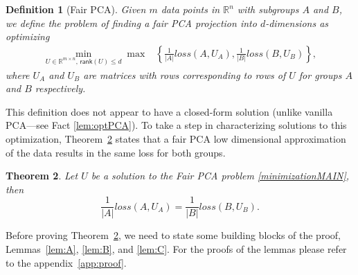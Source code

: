 \documentclass{article}
\newtheorem{theorem}{Theorem}[section]
\newtheorem{definition}[theorem]{Definition} \newtheorem{claim}[theorem]{Claim}
\newcommand{\rank}{\mathsf{rank}}
\newcommand{\R}{\mathbb{R}}
\begin{document}
\begin{definition}[Fair PCA]
  \label{def:fairPCA}
  Given $m$ data points in $\mathbb{R}^n$ with subgroups $A$ and $B$, we define the
  problem of finding a fair PCA projection into $d$-dimensions as
  optimizing
 \begin{align}
 \label{minimizationMAIN}
        \min_{U\in \R^{m\times n} \text{, } \rank(U) \leq  d} \max  & \left\{ \frac{1}{|A|} loss(A,U_A),  \frac{1}{|B|}  loss (B, U_B)\right\},
 \end{align}
 where $U_A$ and $U_B$ are matrices with rows corresponding to rows of 
 $U$ for groups $A$ and $B$ respectively.
\end{definition}

This definition does not appear to have a closed-form solution (unlike
vanilla PCA---see Fact \ref{lem:optPCA}). To take a step in characterizing solutions to this
optimization, Theorem~\ref{thm:sameLoss} states that a fair PCA
low dimensional approximation of the data results in the same loss for both groups.

\begin{theorem}
\label{thm:sameLoss}
Let $U$ be a solution to the Fair PCA problem \eqref{minimizationMAIN}, then
\[
\frac{1}{|A|} loss(A, U_A)= \frac{1}{|B|} loss(B, U_B).
\]
\end{theorem}


Before proving Theorem~\ref{thm:sameLoss}, we need to state some 
building blocks of the proof, Lemmas~\ref{lem:A}, \ref{lem:B}, and \ref{lem:C}. For
the proofs of the lemmas please refer to the appendix~\ref{app:proof}.
\end{document}
